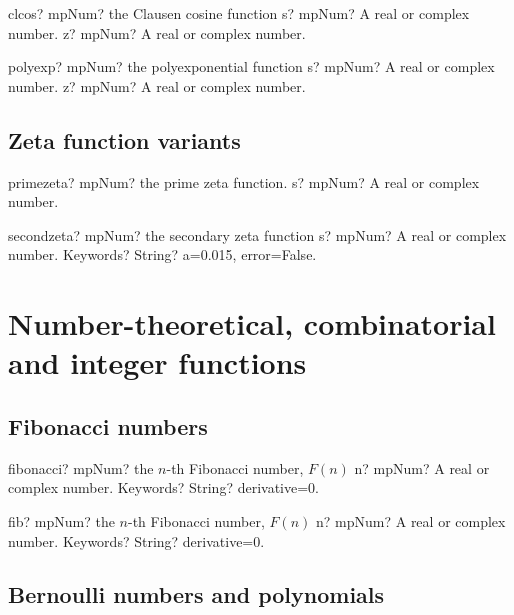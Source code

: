 \documentclass[12pt,a4paper,openany]{book}
\begin{document}
\begin{mpFunctionsExtract}
\mpFunctionTwo
{clcos? mpNum? the Clausen cosine function}
{s? mpNum? A real or complex number.}
{z? mpNum? A real or complex number.}
\end{mpFunctionsExtract}

\begin{mpFunctionsExtract}
\mpFunctionTwo
{polyexp? mpNum? the polyexponential function}
{s? mpNum? A real or complex number.}
{z? mpNum? A real or complex number.}
\end{mpFunctionsExtract}

\section{Zeta function variants}

\begin{mpFunctionsExtract}
\mpFunctionOne
{primezeta? mpNum? the prime zeta function.}
{s? mpNum? A real or complex number.}
\end{mpFunctionsExtract}

\begin{mpFunctionsExtract}
\mpFunctionTwo
{secondzeta? mpNum? the secondary zeta function}
{s? mpNum? A real or complex number.}
{Keywords? String? a=0.015, error=False.}
\end{mpFunctionsExtract}

\chapter{Number-theoretical, combinatorial and integer functions}

\section{Fibonacci numbers}

\begin{mpFunctionsExtract}
\mpFunctionTwo
{fibonacci? mpNum? the $n$-th Fibonacci number, $F(n)$}
{n? mpNum? A real or complex number.}
{Keywords? String? derivative=0.}
\end{mpFunctionsExtract}

\begin{mpFunctionsExtract}
\mpFunctionTwo
{fib? mpNum? the $n$-th Fibonacci number, $F(n)$}
{n? mpNum? A real or complex number.}
{Keywords? String? derivative=0.}
\end{mpFunctionsExtract}

\section{Bernoulli numbers and polynomials}
\end{document}
